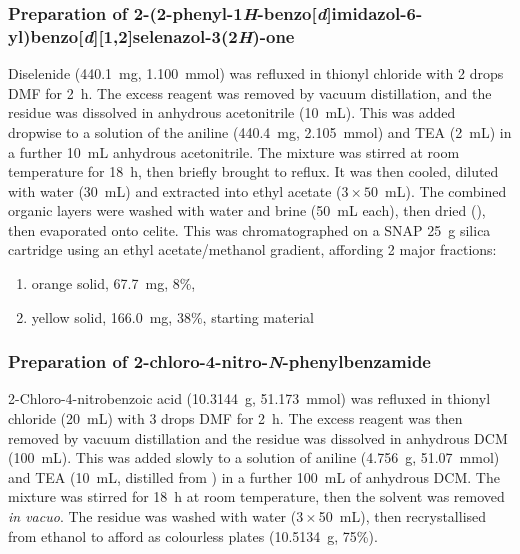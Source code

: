 \begin{refsection}
\subsubsection[Preparation of \refcmpd{ebs-rhs}]{Preparation of 2-(2-phenyl-1\emph{H}-benzo[\emph{d}]imidazol-6-yl)benzo[\emph{d}][1,2]selenazol-3(2\emph{H})-one }
Diselenide  (440.1~mg, 1.100~mmol) was refluxed in thionyl chloride with 2 drops DMF for 2~h.
The excess reagent was removed by vacuum distillation, and the residue was dissolved in anhydrous acetonitrile (10~mL).
This was added dropwise to a solution of the aniline  (440.4~mg, 2.105~mmol) and TEA (2~mL) in a further 10~mL anhydrous acetonitrile.
The mixture was stirred at room temperature for 18~h, then briefly brought to reflux.
It was then cooled, diluted with water (30~mL) and extracted into ethyl acetate ($3\times50$~mL).
The combined organic layers were washed with water and brine (50~mL each), then dried (), then evaporated onto celite.
This was chromatographed on a SNAP 25~g silica cartridge using an ethyl acetate/methanol gradient, affording 2 major fractions:
\begin{enumerate}
    \item orange solid, 67.7~mg, 8\%, 
    \item yellow solid, 166.0~mg, 38\%, starting material 
\end{enumerate}

\subsubsection{Preparation of 2-chloro-4-nitro-\emph{N}-phenylbenzamide }
2-Chloro-4-nitrobenzoic acid (10.3144~g, 51.173~mmol) was refluxed in thionyl chloride (20~mL) with 3 drops DMF for 2~h.
The excess reagent was then removed by vacuum distillation and the residue was dissolved in anhydrous DCM (100~mL).
This was added slowly to a solution of aniline (4.756~g, 51.07~mmol) and TEA (10~mL, distilled from ) in a further 100~mL of anhydrous DCM.
The mixture was stirred for 18~h at room temperature, then the solvent was removed \emph{in vacuo}.
The residue was washed with water ($3\times$50~mL), then recrystallised from ethanol to afford  as colourless plates (10.5134~g, 75\%).

\footnotesize\paragraph{}


\end{refsection}
